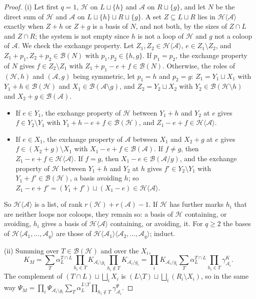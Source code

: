 \documentclass[11pt]{article}
\theoremstyle{plain}
\theoremstyle{definition}
\theoremstyle{remark}
\newcommand{\cB}{\mathcal B}
\begin{document}
\begin{proof}
(i) Let first $q=1$, $\mathcal H$ on $L\sqcup\{h\}$ and $\mathcal A$ on $R\sqcup\{g\}$, and let $N$ be the direct sum of $\mathcal H$ and $\mathcal A$ on $L\sqcup\{h\}\sqcup R\sqcup\{g\}$. A set $Z\subseteq L\sqcup R$ lies in $\mathcal H\langle\mathcal A\rangle$ exactly when $Z+h$ or $Z+g$ is a basis of $N$, and not both, by the sizes of $Z\cap L$ and $Z\cap R$; the system is not empty since $h$ is not a loop of $\mathcal H$ and $g$ not a coloop of $\mathcal A$. We check the exchange property. Let $Z_1,Z_2\in\mathcal H\langle\mathcal A\rangle$, $e\in Z_1\setminus Z_2$, and $Z_1+p_1,Z_2+p_2\in\cB(N)$ with $p_1,p_2\in\{h,g\}$. If $p_1=p_2$, the exchange property of $N$ gives $f\in Z_2\setminus Z_1$ with $Z_1+p_1-e+f\in\cB(N)$. Otherwise, the roles of $(\mathcal H,h)$ and $(\mathcal A,g)$ being symmetric, let $p_1=h$ and $p_2=g$: $Z_1=Y_1\sqcup X_1$ with $Y_1+h\in\cB(\mathcal H)$ and $X_1\in\cB(\mathcal A\setminus g)$, and $Z_2=Y_2\sqcup X_2$ with $Y_2\in\cB(\mathcal H\setminus h)$ and $X_2+g\in\cB(\mathcal A)$.
\begin{itemize}
\item If $e\in Y_1$, the exchange property of $\mathcal H$ between $Y_1+h$ and $Y_2$ at $e$ gives $f\in Y_2\setminus Y_1$ with $Y_1+h-e+f\in\cB(\mathcal H)$, and $Z_1-e+f\in\mathcal H\langle\mathcal A\rangle$.
\item If $e\in X_1$, the exchange property of $\mathcal A$ between $X_1$ and $X_2+g$ at $e$ gives $f\in(X_2+g)\setminus X_1$ with $X_1-e+f\in\cB(\mathcal A)$. If $f\neq g$, then $Z_1-e+f\in\mathcal H\langle\mathcal A\rangle$. If $f=g$, then $X_1-e\in\cB(\mathcal A/g)$, and the exchange property of $\mathcal H$ between $Y_1+h$ and $Y_2$ at $h$ gives $f'\in Y_2\setminus Y_1$ with $Y_1+f'\in\cB(\mathcal H)$, a basis avoiding $h$; so $Z_1-e+f'=(Y_1+f')\sqcup(X_1-e)\in\mathcal H\langle\mathcal A\rangle$.
\end{itemize}
So $\mathcal H\langle\mathcal A\rangle$ is a list, of rank $r(\mathcal H)+r(\mathcal A)-1$. If $\mathcal H$ has further marks $h_i$ that are neither loops nor coloops, they remain so: a basis of $\mathcal H$ containing, or avoiding, $h_i$ gives a basis of $\mathcal H\langle\mathcal A\rangle$ containing, or avoiding, it. For $q\ge2$ the bases of $\mathcal H\langle\mathcal A_1,\dots,\mathcal A_q\rangle$ are those of $\mathcal H\langle\mathcal A_1\rangle\langle\mathcal A_2,\dots,\mathcal A_q\rangle$; induct.

(ii) Summing over $T\in\cB(\mathcal H)$ and over the $X_i$,
\[
K_M=\sum_T\alpha_L^{T\cap L}\prod_{h_i\in T}K_{\mathcal A_i\setminus g_i}\prod_{h_i\notin T}K_{\mathcal A_i/g_i}=\prod_iK_{\mathcal A_i/g_i}\sum_T\alpha_L^{T\cap L}\prod_{h_i\in T}\gamma^K_{\mathcal A_i}.
\]
The complement of $(T\cap L)\sqcup\bigsqcup_iX_i$ is $(L\setminus T)\sqcup\bigsqcup_i(R_i\setminus X_i)$, so in the same way $\Psi_M=\prod_i\Psi_{\mathcal A_i\setminus g_i}\sum_T\alpha_L^{L\setminus T}\prod_{h_i\notin T}\gamma^\Psi_{\mathcal A_i}$.


\end{proof}
\end{document}
